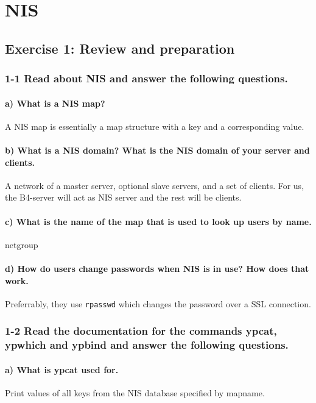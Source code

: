 
\chapter{NIS}
\section{Exercise 1: Review and preparation}
\subsection{1-1 Read about NIS and answer the following questions.}
\subsubsection{a) What is a NIS map?}
A NIS map is essentially a map structure with a key and a corresponding value.

\subsubsection{b) What is a NIS domain? What is the NIS domain of your server and clients.}
A network of a master server, optional slave servers, and a set of clients. For us, the B4-server will act as NIS server and the rest will be clients.

\subsubsection{c) What is the name of the map that is used to look up users by name.}
netgroup

\subsubsection{d) How do users change passwords when NIS is in use? How does that work.}
Preferrably, they use \verb=rpasswd= which changes the password over a SSL connection.

\subsection{1-2 Read the documentation for the commands ypcat, ypwhich and ypbind and answer the following questions.}
\subsubsection{a) What is ypcat used for.}
Print values of all keys from the NIS database specified by mapname.

